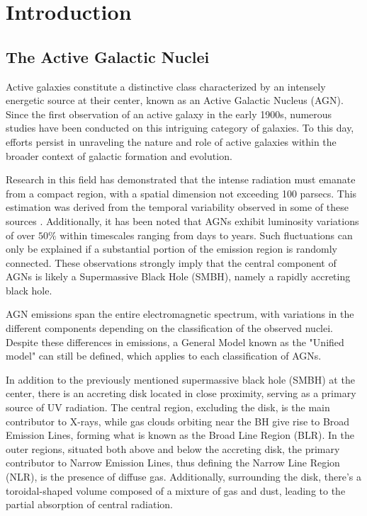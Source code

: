 \chapter{Introduction}

\section{The Active Galactic Nuclei}
Active galaxies constitute a distinctive class characterized by an intensely energetic source at their center, known as an Active Galactic Nucleus (AGN). Since the first observation of an active galaxy in the early 1900s, numerous studies have been conducted on this intriguing category of galaxies. To this day, efforts persist in unraveling the nature and role of active galaxies within the broader context of galactic formation and evolution.

Research in this field has demonstrated that the intense radiation must emanate from a compact region, with a spatial dimension not exceeding 100 parsecs. This estimation was derived from the temporal variability observed in some of these sources \cite{1959ApJ...130...38W}. Additionally, it has been noted that AGNs exhibit luminosity variations of over $50\%$ within timescales ranging from days to years. Such fluctuations can only be explained if a substantial portion of the emission region is randomly connected. These observations strongly imply that the central component of AGNs is likely a Supermassive Black Hole (SMBH), namely a rapidly accreting black hole.

AGN emissions span the entire electromagnetic spectrum, with variations in the different components depending on the classification of the observed nuclei. Despite these differences in emissions, a General Model known as the "Unified model" can still be defined, which applies to each classification of AGNs. \cite{1995PASP..107..803U}

In addition to the previously mentioned supermassive black hole (SMBH) at the center, there is an accreting disk located in close proximity, serving as a primary source of UV radiation. The central region, excluding the disk, is the main contributor to X-rays, while gas clouds orbiting near the BH give rise to Broad Emission Lines, forming what is known as the Broad Line Region (BLR).
In the outer regions, situated both above and below the accreting disk, the primary contributor to Narrow Emission Lines, thus defining the Narrow Line Region (NLR), is the presence of diffuse gas. Additionally, surrounding the disk, there's a toroidal-shaped volume composed of a mixture of gas and dust, leading to the partial absorption of central radiation.

